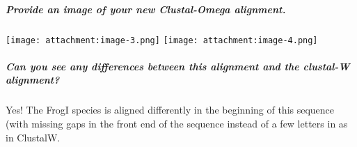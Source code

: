 \documentclass[
]{article}
\begin{document}
\hypertarget{provide-an-image-of-your-new-clustal-omega-alignment.}{%
\subparagraph{Provide an image of your new Clustal-Omega
alignment.}\label{provide-an-image-of-your-new-clustal-omega-alignment.}}

\texttt{[image: attachment:image-3.png]}
\texttt{[image: attachment:image-4.png]}

\hypertarget{can-you-see-any-differences-between-this-alignment-and-the-clustal-w-alignment}{%
\subparagraph{Can you see any differences between this alignment and the
clustal-W
alignment?}\label{can-you-see-any-differences-between-this-alignment-and-the-clustal-w-alignment}}

Yes! The FrogI species is aligned differently in the beginning of this
sequence (with missing gaps in the front end of the sequence instead of
a few letters in as in ClustalW.
\end{document}
